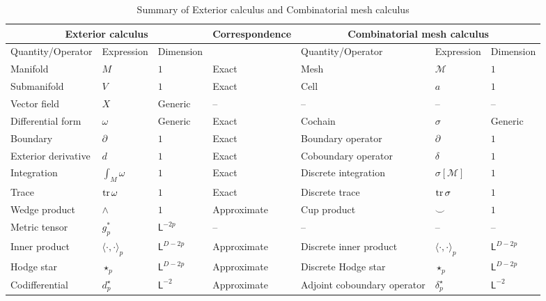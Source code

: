 \documentclass{elsarticle}
\theoremstyle{definition}
\newcommand{\inner}[2]{\langle#1,#2\rangle}
\newcommand{\tr}{\mathop{\rm tr}\nolimits}
\newcommand{\length}{\mathsf{L}}
\begin{document}
\begin{table}[!ht]
  \caption{Summary of Exterior calculus and Combinatorial mesh calculus}
  \label{tab:calculus_summary}
  \centering
  \begin{tabular}{|l|l|l||l||l|l|l|}
    \hline
    \multicolumn{3}{|c||}{Exterior calculus}
    & Correspondence
    & \multicolumn{3}{|c|}{Combinatorial mesh calculus} \\
    \hline
    Quantity/Operator & Expression & Dimension
    &
    & Quantity/Operator & Expression & Dimension \\
    \hline
    Manifold & $M$ & $1$
    & Exact
    & Mesh & $\mathcal{M}$ & $1$ \\
    Submanifold & $V$ & $1$
    & Exact
    & Cell & $a$ & $1$ \\
    Vector field & $X$ & Generic
    & --
    & -- & -- & -- \\
    Differential form & $\omega$ & Generic
    & Exact
    & Cochain & $\sigma$ & Generic \\
    Boundary & $\partial$ & $1$
    & Exact
    & Boundary operator & $\partial$ & $1$ \\
    Exterior derivative & $d$ & $1$
    & Exact
    & Coboundary operator & $\delta$ & $1$ \\
    Integration & $\int_M \omega$ & $1$
    & Exact
    & Discrete integration & $\sigma [\mathcal{M}]$ & $1$ \\
    Trace & $\tr \omega$ & $1$
    & Exact
    & Discrete trace & $\tr \sigma$ & $1$ \\
    Wedge product & $\wedge$ & $1$
    & Approximate
    & Cup product & $\smile$ & $1$ \\
    Metric tensor & $g^*_p$ & $\length^{- 2 p}$
    & --
    & -- & -- & -- \\
    Inner product & $\inner{\cdot}{\cdot}_p$ & $\length^{D - 2 p}$
    & Approximate
    & Discrete inner product & $\inner{\cdot}{\cdot}_p$ & $\length^{D - 2 p}$ \\
    Hodge star & $\star_p$ & $\length^{D - 2 p}$
    & Approximate
    & Discrete Hodge star & $\star_p$ & $\length^{D - 2 p}$ \\
    Codifferential & $d^{\star}_p$ & $\length^{-2}$
    & Approximate
    & Adjoint coboundary operator & $\delta^{\star}_p$ & $\length^{-2}$ \\
    \hline
  \end{tabular}
\end{table}
\end{document}
